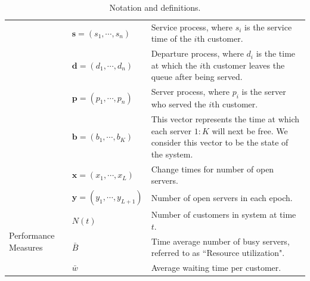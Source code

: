 \documentclass[article]{jss}
\begin{document}
\begin{table}
{\begin{tabular}{|l|l|p{10cm}|}
& $\mathbf{s} = (s_1, \cdots, s_n )$ & Service process, where $s_i$ is the service time of the $i$th customer. \\

& $\mathbf{d} = (d_1, \cdots, d_n )$ & Departure process, where $d_i$ is the time at which the $i$th customer leaves the queue after being served. \\

& $\mathbf{p} = (p_1, \cdots, p_n )$ & Server process, where $p_i$ is the server who served the $i$th customer. \\

& $\mathbf{b} = (b_1, \cdots, b_K )$ & This vector represents the time at which each server $1:K$ will next be free. We consider this vector to be the state of the system. \\ 

& $\mathbf{x} = (x_1, \cdots, x_L )$ & Change times for number of open servers. \\ 

& $\mathbf{y} = (y_1, \cdots, y_{L+1} )$ & Number of open servers in each epoch. \\



\hline

\multirow{4}{3cm}{Performance Measures}

& $N(t)$ & Number of customers in system at time $t$. \\
& $\bar{B}$ & Time average number of busy servers, referred to as ``Resource utilization". \\
& $\bar{w}$ & Average waiting time per customer. \\

\hline

\end{tabular}
}
\caption{Notation and definitions.}
\end{table}
\end{document}
